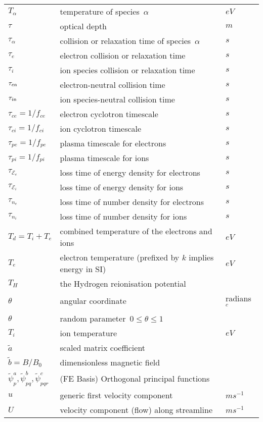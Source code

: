 \begin{longtable}{|p{3.0cm}|p{10.0cm}|p{3.0cm}|}
$T_\alpha$ & temperature of species~$\alpha$  & $eV$ \\
$\tau$ & optical depth  & $m$ \\
$\tau_\alpha$ & collision or relaxation time of species~$\alpha$   & $s$ \\
$\tau_e$ & electron collision or relaxation time   & $s$ \\
$\tau_i$ & ion species collision or relaxation time   & $s$ \\
$\tau_{e{\sf n}} $ & electron-neutral collision time   & $s$ \\
$\tau_{i{\sf n}} $ & ion species-neutral collision time   & $s$ \\
$\tau_{ce}=1/f_{ce}$ & electron cyclotron timescale & $s$ \\
$\tau_{ci}=1/f_{ci}$ & ion cyclotron timescale & $s$ \\
$\tau_{pe}=1/f_{pe}$ & plasma timescale for electrons & $s$ \\
$\tau_{pi}=1/f_{pi}$ & plasma timescale for ions & $s$ \\
$\tau_{\mathcal{E}_e}$ & loss time of energy density for electrons   & $s$ \\
$\tau_{\mathcal{E}_i}$ & loss time of energy density for ions   & $s$ \\
$\tau_{n_e}$ & loss time of number density for electrons   & $s$ \\
$\tau_{n_i}$ & loss time of number density for ions   & $s$ \\
$T_d=T_i+T_e$ & combined temperature of the electrons and ions  & $eV$ \\
$T_e$ & electron temperature (prefixed by $k$ implies energy in SI)  & $eV$ \\
$T_H$ & the Hydrogen reionisation potential  & \\
$\theta$ & angular coordinate & radians $^c$ \\
$\theta$ & random parameter~$0\leq\theta\leq 1$ & \\
$T_i$ & ion temperature  & $eV$ \\
$\tilde{a}$ & scaled matrix coefficient & \\
$\tilde{b}=B/B_0$ & dimensionless magnetic field & \\
$\tilde{\psi}^a_p, \tilde{\psi}^b_{pq}, \tilde{\psi}^c_{pqr}$ &  (FE Basis) Orthogonal principal functions & \\
$u$ & generic first velocity component  & $m s^{-1}$ \\
$U$ & velocity component (flow) along streamline  & $m s^{-1}$ \\

\end{longtable}
